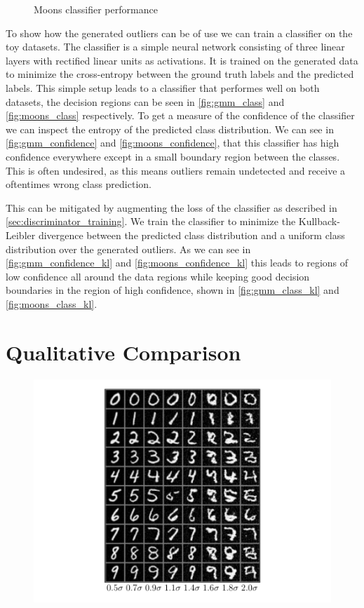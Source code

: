 \begin{figure}[htpb]
    \caption{Moons classifier performance}%
    \label{fig:classifier_moons}
\end{figure}

To show how the generated outliers can be of use we can train a classifier on
the toy datasets. The classifier is a simple neural network consisting of three
linear layers with rectified linear units as activations. It is trained on the
generated data to minimize the cross-entropy between the ground truth labels
and the predicted labels. This simple setup leads to a classifier that
performes well on both datasets, the decision regions can be seen in
\autoref{fig:gmm_class} and \autoref{fig:moons_class} respectively. To get a
measure of the confidence of the classifier we can inspect the entropy of the
predicted class distribution. We can see in \autoref{fig:gmm_confidence} and
\autoref{fig:moons_confidence}, that this classifier has high confidence
everywhere except in a small boundary region between the classes. This is often
undesired, as this means outliers remain undetected and receive a oftentimes
wrong class prediction. 

This can be mitigated by augmenting the loss of the classifier as described in
\autoref{sec:discriminator_training}. We train the classifier to minimize the
Kullback-Leibler divergence between the predicted class distribution and a
uniform class distribution over the generated outliers. As we can see in
\autoref{fig:gmm_confidence_kl} and \autoref{fig:moons_confidence_kl} this
leads to regions of low confidence all around the data regions while keeping
good decision boundaries in the region of high confidence, shown in
\autoref{fig:gmm_class_kl} and \autoref{fig:moons_class_kl}.

\section{Qualitative Comparison}%
\label{sec:qualitative_comparison}

\begin{figure}[htpb]
    \centering
    \includegraphics[width=0.8\linewidth]{figures/samples/emnist_inc_distance.pdf}
    \caption{}%
    \label{fig:}
\end{figure}

